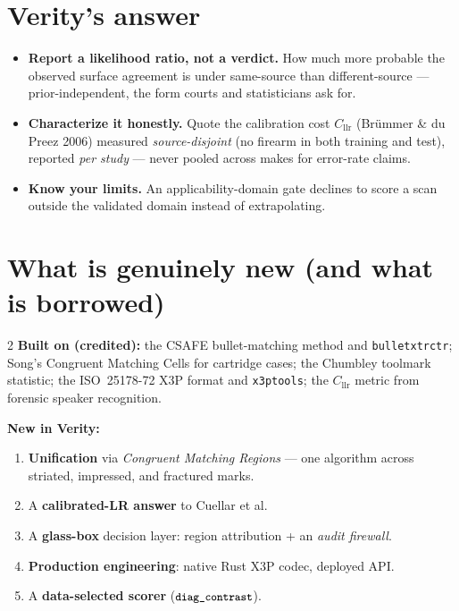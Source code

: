 \documentclass[10pt]{article}
\newcommand{\Cllr}{C_{\mathrm{llr}}}
\newcommand{\code}[1]{\texttt{\small #1}}
\begin{document}
\section{Verity's answer}
\begin{itemize}
  \item \textbf{Report a likelihood ratio, not a verdict.} How much more probable the
        observed surface agreement is under same-source than different-source ---
        prior-independent, the form courts and statisticians ask for.
  \item \textbf{Characterize it honestly.} Quote the calibration cost $\Cllr$
        (Br\"ummer \& du Preez 2006) measured \emph{source-disjoint} (no firearm in
        both training and test), reported \emph{per study} --- never pooled across
        makes for error-rate claims.
  \item \textbf{Know your limits.} An applicability-domain gate declines to score a
        scan outside the validated domain instead of extrapolating.
\end{itemize}

\section{What is genuinely new (and what is borrowed)}
\begin{multicols}{2}
\textbf{Built on (credited):} the CSAFE bullet-matching method and
\code{bulletxtrctr}; Song's Congruent Matching Cells for cartridge cases; the
Chumbley toolmark statistic; the ISO~25178-72 X3P format and \code{x3ptools}; the
$\Cllr$ metric from forensic speaker recognition.

\columnbreak

\textbf{New in Verity:}
\begin{enumerate}[leftmargin=1.3em]
  \item \textbf{Unification} via \emph{Congruent Matching Regions} --- one algorithm
        across striated, impressed, and fractured marks.
  \item A \textbf{calibrated-LR answer} to Cuellar et al.
  \item A \textbf{glass-box} decision layer: region attribution + an
        \emph{audit firewall}.
  \item \textbf{Production engineering}: native Rust X3P codec, deployed API.
  \item A \textbf{data-selected scorer} ($\code{diag\_contrast}$).
\end{enumerate}
\end{multicols}
\end{document}
